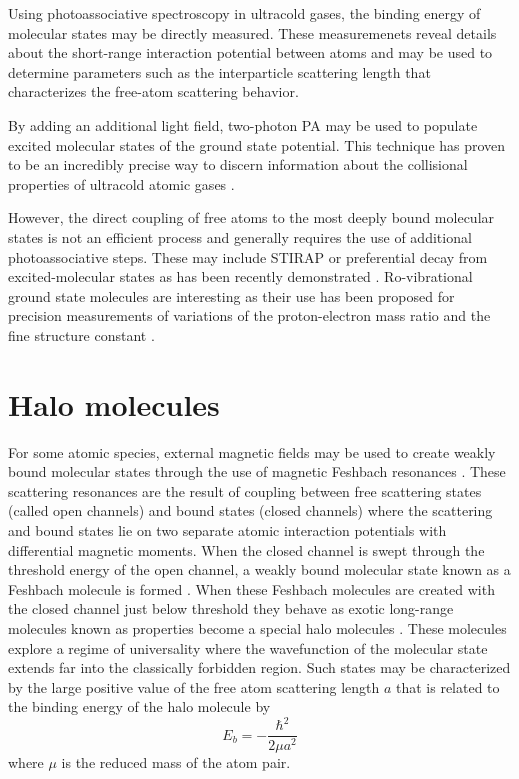 Using photoassociative spectroscopy in ultracold gases, the binding energy of molecular states may be directly measured.
These measuremenets reveal details about the short-range interaction potential between atoms and may be used to determine parameters such as the interparticle scattering length that characterizes the free-atom scattering behavior.

By adding an additional light field, two-photon PA may be used to populate excited molecular states of the ground state potential.
This technique has proven to be an incredibly precise way to discern information about the collisional properties of ultracold atomic gases \cite{MartinezDeEscobar2008, Aman2018}.

However, the direct coupling of free atoms to the most deeply bound molecular states is not an efficient process and generally requires the use of additional photoassociative steps.
These may include STIRAP or preferential decay from excited-molecular states as has been recently demonstrated \cite{Reinaudi2012, cbc17, Stellmer2012, Ciamei2017}.
Ro-vibrational ground state molecules are interesting as their use has been proposed for precision measurements of variations of the proton-electron mass ratio \cite{zky08, Kotochigova2009} and the fine structure constant \cite{Beloy2011}. 


\section{Halo molecules} \label{sec:halo}
For some atomic species, external magnetic fields may be used to create weakly bound molecular states through the use of magnetic Feshbach resonances \cite{Kohler2006, Chin2010}.
These scattering resonances are the result of coupling between free scattering states (called open channels) and bound states (closed channels) where the scattering and bound states lie on two separate atomic interaction potentials with differential magnetic moments.
When the closed channel is swept through the threshold energy of the open channel, a weakly bound molecular state known as a Feshbach molecule is formed \cite{cbk03, grj03,hkm03,rtb03,sph03}.
When these Feshbach molecules are created with the closed channel just below threshold they behave as exotic long-range molecules known as  properties become a special halo molecules \cite{Kohler2006}.
These molecules explore a regime of universality where the wavefunction of the molecular state extends far into the classically forbidden region.
Such states may be characterized by the large positive value of the free atom scattering length $a$ that is related to the binding energy of the halo molecule by
\begin{equation}
	E_b = -\frac{\hbar^2}{2 \mu a^2}
\end{equation}
where $\mu$ is the reduced mass of the atom pair.

